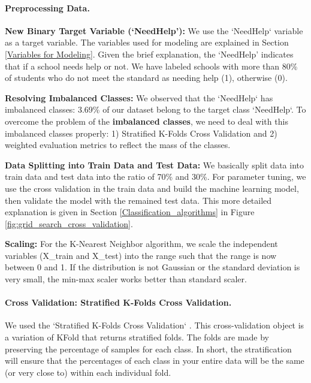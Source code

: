 \documentclass[11pt]{article}
\begin{document}
\paragraph*{Preprocessing Data.\\}

\noindent \textbf{New Binary Target Variable (`NeedHelp'):} We use the `NeedHelp` variable as a target variable. The variables used for modeling are explained in Section \ref{Variables for Modeling}.
%
Given the brief explanation, the `NeedHelp' indicates that if a school needs help or not. We have labeled schools with more than 80\% of students who do not meet the standard as needing help (1), otherwise (0).

\noindent \textbf{Resolving Imbalanced Classes:} We observed that the `NeedHelp` has imbalanced classes: 3.69\% of our dataset belong to the target class `NeedHelp`.
%
To overcome the problem of the \textbf{imbalanced classes}, we need to deal with this imbalanced classes properly: 1) Stratified K-Folds Cross Validation and 2) weighted evaluation metrics to reflect the mass of the classes.

\noindent \textbf{Data Splitting into Train Data and Test Data:}
We basically split data into train data and test data into the ratio of 70\% and 30\%. For parameter tuning, we use the cross validation in the train data and build the machine learning model, then validate the model with the remained test data. This more detailed explanation is given in Section \ref{Classification_algorithms} in Figure \ref{fig:grid_search_cross_validation}. 

\noindent \textbf{Scaling:} For the K-Nearest Neighbor algorithm, we scale the independent variables (X\_train and X\_test) into the  
range such that the range is now between 0 and 1. 
%
If the distribution is not Gaussian or the standard deviation is very small, the min-max scaler works better than standard scaler.

\paragraph*{Cross Validation: Stratified K-Folds Cross Validation.}

We used the `Stratified K-Folds Cross Validation` \cite{stratified_cv}.
This cross-validation object is a variation of KFold that returns stratified folds. The folds are made by preserving the percentage of samples for each class. In short, the stratification will ensure that the percentages of each class in your entire data will be the same (or very close to) within each individual fold.  
\end{document}
